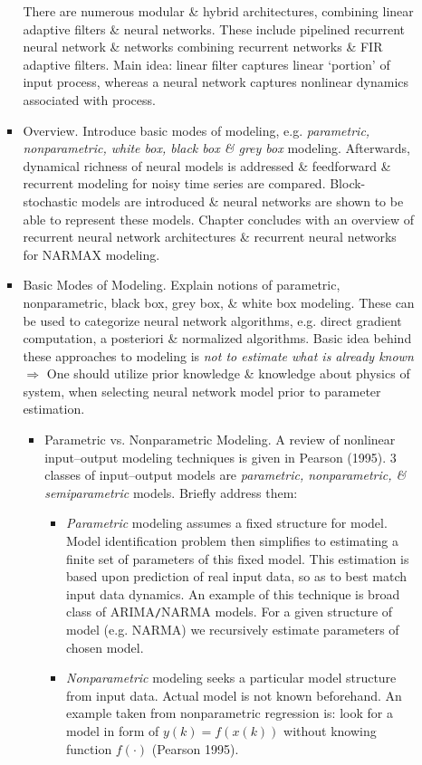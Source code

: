 \documentclass{article}
\begin{document}
\begin{enumerate}
\begin{itemize}
\begin{itemize}
			There are numerous modular \& hybrid architectures, combining linear adaptive filters \& neural networks. These include pipelined recurrent neural network \& networks combining recurrent networks \& FIR adaptive filters. Main idea: linear filter captures linear `portion' of input process, whereas a neural network captures nonlinear dynamics associated with process.
			\item {\sf Overview.} Introduce basic modes of modeling, e.g. {\it parametric, nonparametric, white box, black box \& grey box} modeling. Afterwards, dynamical richness of neural models is addressed \& feedforward \& recurrent modeling for noisy time series are compared. Block-stochastic models are introduced \& neural networks are shown to be able to represent these models. Chapter concludes with an overview of recurrent neural network architectures \& recurrent neural networks for NARMAX modeling.
			\item {\sf Basic Modes of Modeling.} Explain notions of parametric, nonparametric, black box, grey box, \& white box modeling. These can be used to categorize neural network algorithms, e.g. direct gradient computation, a posteriori \& normalized algorithms. Basic idea behind these approaches to modeling is {\it not to estimate what is already known} $\Rightarrow$ One should utilize prior knowledge \& knowledge about physics of system, when selecting neural network model prior to parameter estimation.
			\begin{itemize}
				\item {\sf Parametric vs. Nonparametric Modeling.} A review of nonlinear input--output modeling techniques is given in Pearson (1995). 3 classes of input--output models are {\it parametric, nonparametric, \& semiparametric} models. Briefly address them:
				\begin{itemize}
					\item {\it Parametric} modeling assumes a fixed structure for model. Model identification problem then simplifies to estimating a finite set of parameters of this fixed model. This estimation is based upon prediction of real input data, so as to best match input data dynamics. An example of this technique is broad class of ARIMA{\tt/}NARMA models. For a given structure of model (e.g. NARMA) we recursively estimate parameters of chosen model.
					\item {\it Nonparametric} modeling seeks a particular model structure from input data. Actual model is not known beforehand. An example taken from nonparametric regression is: look for a model in form of $y(k) = f(x(k))$ without knowing function $f(\cdot)$ (Pearson 1995).

\end{itemize}
\end{itemize}
\end{itemize}
\end{itemize}
\end{enumerate}
\end{document}
